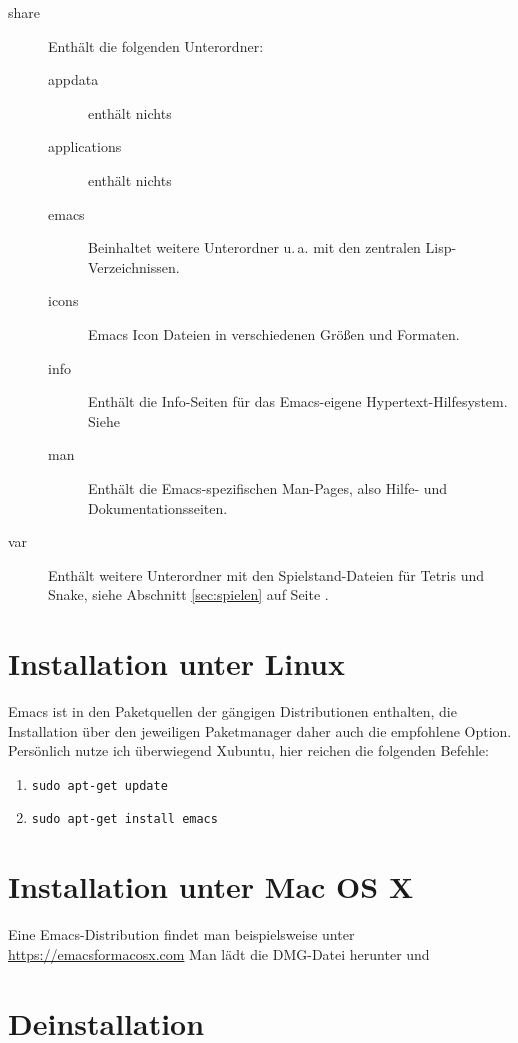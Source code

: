 \documentclass[12pt,ngerman]{scrbook}
\begin{document}
\begin{description}
\item[share] Enthält die folgenden Unterordner:

\begin{description}
\item[appdata] enthält nichts
\item[applications] enthält nichts
\item[emacs] Beinhaltet weitere Unterordner u.\,a. mit den zentralen Lisp-Verzeichnissen.
\item[icons] Emacs Icon Dateien in verschiedenen Größen und Formaten.
\item[info] Enthält die Info-Seiten für das Emacs-eigene Hypertext-Hilfesystem. Siehe 
\item[man] Enthält die Emacs-spezifischen Man-Pages, also Hilfe- und Dokumentationsseiten. 
\end{description}



\item[var] Enthält weitere Unterordner mit den Spielstand-Dateien für Tetris und Snake, siehe Abschnitt \ref{sec:spielen} auf Seite \pageref{sec:spielen}.
\end{description}

\section{Installation unter Linux}

Emacs ist in den Paketquellen der gängigen Distributionen enthalten, die Installation über den jeweiligen Paketmanager daher auch die empfohlene Option. Persönlich nutze ich überwiegend Xubuntu, hier reichen die folgenden Befehle:

\begin{enumerate}
\item \texttt{sudo apt-get update}
\item \texttt{sudo apt-get install emacs}
\end{enumerate}

\section{Installation unter Mac OS X}

Eine Emacs-Distribution findet man beispielsweise unter \url{https://emacsformacosx.com}
Man lädt die DMG-Datei herunter und 


\section{Deinstallation}
\end{document}
